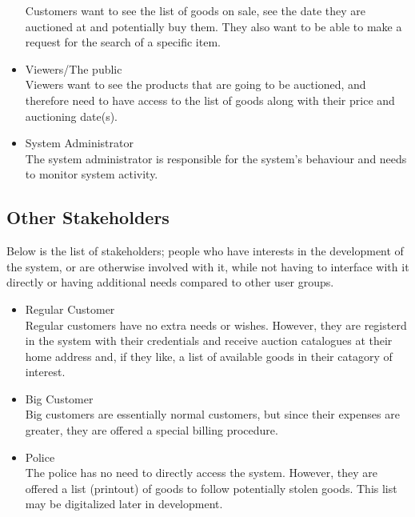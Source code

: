 \begin{itemize}[noitemsep]
		Customers want to see the list of goods on sale, see the date they are auctioned at and potentially buy them. They also want to be able to make a request for the search of a specific item.
	\item Viewers/The public\\
		Viewers want to see the products that are going to be auctioned, and therefore need to have access to the list of goods along with their price and auctioning date(s).
	\item System Administrator\\
		The system administrator is responsible for the system's behaviour and needs to monitor system activity.
\end{itemize}

\subsection{Other Stakeholders}
Below is the list of stakeholders; people who have interests in the development of the system, or are otherwise involved with it, while not having to interface with it directly or having additional needs compared to other user groups.
\begin{itemize}[noitemsep]
	\item Regular Customer\\
		Regular customers have no extra needs or wishes. However, they are registerd in the system with their credentials and receive auction catalogues at their home address and, if they like, a list of available goods in their catagory of interest.
	\item Big Customer\\
		Big customers are essentially normal customers, but since their expenses are greater, they are offered a special billing procedure.
	\item Police\\
		The police has no need to directly access the system. However, they are offered a list (printout) of goods to follow potentially stolen goods. This list may be digitalized later in development.
\end{itemize}

